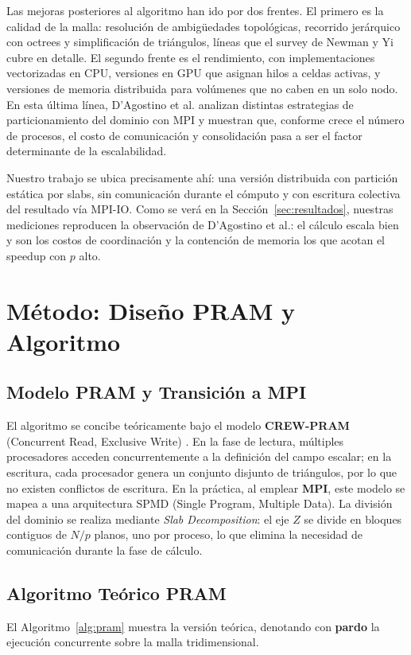 \documentclass[conference]{IEEEtran}
\begin{document}
Las mejoras posteriores al algoritmo han ido por dos frentes. El primero es la calidad de la malla: resolución de ambigüedades topológicas, recorrido jerárquico con octrees y simplificación de triángulos, líneas que el survey de Newman y Yi \cite{b2} cubre en detalle. El segundo frente es el rendimiento, con implementaciones vectorizadas en CPU, versiones en GPU que asignan hilos a celdas activas, y versiones de memoria distribuida para volúmenes que no caben en un solo nodo. En esta última línea, D'Agostino et al. \cite{b5} analizan distintas estrategias de particionamiento del dominio con MPI y muestran que, conforme crece el número de procesos, el costo de comunicación y consolidación pasa a ser el factor determinante de la escalabilidad.

Nuestro trabajo se ubica precisamente ahí: una versión distribuida con partición estática por slabs, sin comunicación durante el cómputo y con escritura colectiva del resultado vía MPI-IO. Como se verá en la Sección~\ref{sec:resultados}, nuestras mediciones reproducen la observación de D'Agostino et al.: el cálculo escala bien y son los costos de coordinación y la contención de memoria los que acotan el speedup con $p$ alto.

\section{Método: Diseño PRAM y Algoritmo}

\subsection{Modelo PRAM y Transición a MPI}
El algoritmo se concibe teóricamente bajo el modelo \textbf{CREW-PRAM} (Concurrent Read, Exclusive Write) \cite{b6}. En la fase de lectura, múltiples procesadores acceden concurrentemente a la definición del campo escalar; en la escritura, cada procesador genera un conjunto disjunto de triángulos, por lo que no existen conflictos de escritura. En la práctica, al emplear \textbf{MPI}, este modelo se mapea a una arquitectura SPMD (Single Program, Multiple Data). La división del dominio se realiza mediante \textit{Slab Decomposition}: el eje $Z$ se divide en bloques contiguos de $N/p$ planos, uno por proceso, lo que elimina la necesidad de comunicación durante la fase de cálculo.

\subsection{Algoritmo Teórico PRAM}
El Algoritmo~\ref{alg:pram} muestra la versión teórica, denotando con \textbf{pardo} la ejecución concurrente sobre la malla tridimensional.
\end{document}
